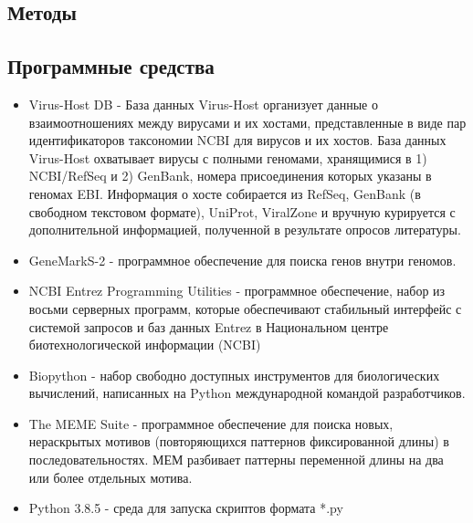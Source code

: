 \documentclass[14pt]{extarticle}
\begin{document}
    
\newpage
\begin{center}
\item \section{Методы} \label{sec:code}
\item \subsection{Программные средства}
\end{center}
\begin{itemize}
    \item Virus-Host DB - База данных Virus-Host организует данные о взаимоотношениях между вирусами и их хостами,
    представленные в виде пар идентификаторов таксономии NCBI для вирусов и их хостов. База данных Virus-Host охватывает
    вирусы с полными геномами, хранящимися в 1) NCBI/RefSeq и 2) GenBank, номера присоединения которых указаны в геномах
    EBI. Информация о хосте собирается из RefSeq, GenBank (в свободном текстовом формате), UniProt, ViralZone и вручную
    курируется с дополнительной информацией, полученной в результате опросов литературы. \cite{virus-host}
    
    \item GeneMarkS-2 - программное обеспечение для поиска генов внутри геномов. \cite{lomsad}
    
    \item NCBI Entrez Programming Utilities - программное обеспечение, набор из восьми серверных программ, которые
    обеспечивают стабильный интерфейс с системой запросов и баз данных Entrez в Национальном центре биотехнологической
    информации (NCBI) \cite{entrez}
    
    \item Biopython - набор свободно доступных инструментов для биологических вычислений, написанных на Python
    международной командой разработчиков. \cite{biopython}
    
    \item The MEME Suite - программное обеспечение для поиска новых, нераскрытых мотивов (повторяющихся паттернов
    фиксированной длины) в последовательностях. МЕМ разбивает паттерны переменной длины на два или более отдельных
    мотива. \cite{bailey}
    
    \item Python 3.8.5 - среда для запуска скриптов формата *.py \cite{python}
    

\end{itemize}
\end{document}
